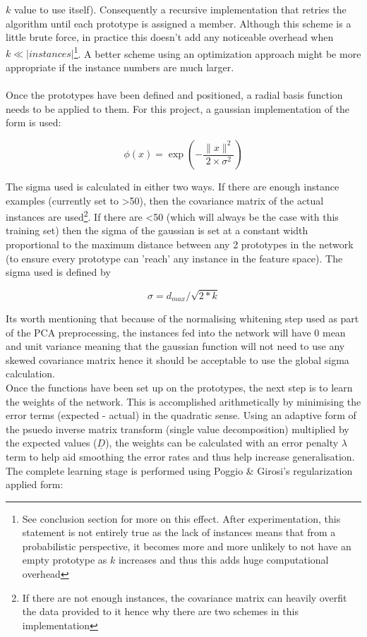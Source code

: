 \documentclass[twocolumn]{article}
\begin{document}
$k$ value to use itself). Consequently a recursive implementation that retries the algorithm until each prototype is assigned a member. Although this
scheme is a little brute force, in practice this doesn't add any noticeable overhead when $k\ll|instances|$\footnote{See conclusion section for more 
on this effect. After experimentation, this statement is not entirely true as the lack of instances means that from a probabilistic perspective,
it becomes more and more unlikely to not have an empty prototype as $k$ increases and thus this adds huge computational overhead}. A better scheme using an optimization
approach might be more appropriate if the instance numbers are much larger.\\
\\
Once the prototypes have been defined and positioned, a radial basis function needs to be applied to them. For this project, a gaussian implementation
of the form is used:

\[
 \phi(x) = \exp(-\frac{\|x\|^2}{2 \times \sigma^2})
\]

The sigma used is calculated in either two ways. If there are enough instance examples (currently set to \textgreater 50), then the covariance 
matrix of the actual instances are used\footnote{If there are not enough instances, the covariance matrix can heavily overfit the data provided to it
hence why there are two schemes in this implementation}. If there are \textless 50 (which will always be the case with this training set) then the sigma of the
gaussian is set at a constant width proportional to the maximum distance between any 2 prototypes in the network (to ensure every prototype can
'reach' any instance in the feature space). The sigma used is defined by 

\[
\sigma = d_{max} / \sqrt{2 * k}
\]

Its worth mentioning that because of the normalising whitening step used as part of the PCA preprocessing, the instances fed into the network will
have 0 mean and unit variance meaning that the gaussian function will not need to use any skewed covariance matrix hence it should be acceptable
to use the global sigma calculation.\\
Once the functions have been set up on the prototypes, the next step is to learn the weights of the network. This is accomplished arithmetically
by minimising the error terms (expected - actual) in the quadratic sense. Using an adaptive form of the psuedo inverse matrix transform (single
value decomposition) multiplied by the expected values ($\underline{D}$), the weights can be calculated with an error penalty $\lambda$ term to help 
aid smoothing the error rates and thus help increase generalisation. The complete learning stage is performed using Poggio \& Girosi's 
regularization applied form\cite{poggio}:
\end{document}
